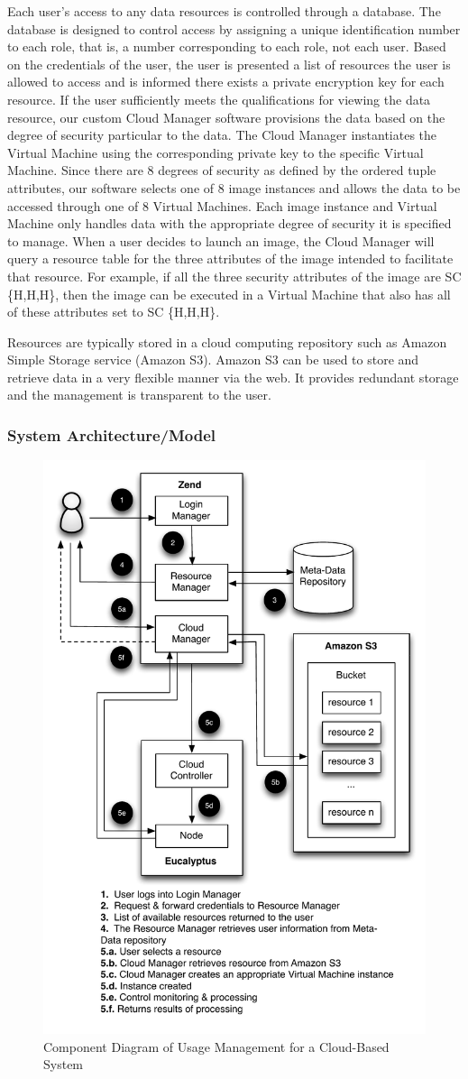 \documentclass{sig-alternate}
\begin{document}
Each user's access to any data resources is controlled through a database. The database is designed to control access by assigning a unique identification number to each role, that is, a number corresponding to each role, not each user. Based on the credentials of the user, the user is presented a list of resources the user is allowed to access and is informed there exists a private encryption key for each resource. If the user sufficiently meets the qualifications for viewing the data resource, our custom Cloud Manager software provisions the data based on the degree of security particular to the data. The Cloud Manager instantiates the Virtual Machine using the corresponding private key to the specific Virtual Machine. Since there are 8 degrees of security as defined by the ordered tuple attributes, our software selects one of 8 image instances and allows the data to be accessed through one of 8 Virtual Machines.  Each image instance and Virtual Machine only handles data with the appropriate degree of security it is specified to manage. When a user decides to launch an image, the Cloud Manager will query a resource table for the three attributes of the image intended to facilitate that resource. For example, if all the three security attributes of the image are SC \{H,H,H\}, then the image can be executed in a Virtual Machine that also has all of these attributes set to SC \{H,H,H\}. 

Resources are typically stored in a cloud computing repository such as Amazon Simple Storage service (Amazon S3). Amazon S3 can be used to store and retrieve data in a very flexible manner via the web. It provides redundant storage and the management is transparent to the user.

\subsubsection{System Architecture/Model}
\begin{figure}[h]
  \begin{center}
    \includegraphics[width=.49\textwidth]{component}
  \end{center}
  \caption{Component Diagram of Usage Management for a Cloud-Based System}
  \label{fig:convergence}
\end{figure}
\end{document}

